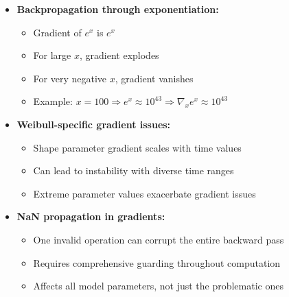 \begin{itemize}
    \item \textbf{Backpropagation through exponentiation:}
    \begin{itemize}
        \item Gradient of $e^x$ is $e^x$
        \item For large $x$, gradient explodes
        \item For very negative $x$, gradient vanishes
        \item Example: $x = 100 \Rightarrow e^x \approx 10^{43} \Rightarrow \nabla_x e^x \approx 10^{43}$
    \end{itemize}

    \item \textbf{Weibull-specific gradient issues:}
    \begin{itemize}
        \item Shape parameter gradient scales with time values
        \item Can lead to instability with diverse time ranges
        \item Extreme parameter values exacerbate gradient issues
    \end{itemize}

    \item \textbf{NaN propagation in gradients:}
    \begin{itemize}
        \item One invalid operation can corrupt the entire backward pass
        \item Requires comprehensive guarding throughout computation
        \item Affects all model parameters, not just the problematic ones
    \end{itemize}
\end{itemize}

